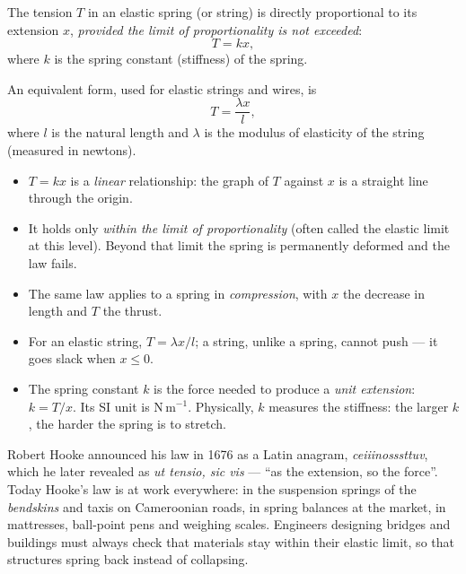 \documentclass[11pt]{article}
\newcommand{\cle}[1]{{\popxbold\color{popdark}#1}}
\begin{document}
\begin{propriete}
The \cle{tension} $T$ in an elastic spring (or string) is directly proportional to its \cle{extension} $x$, \emph{provided the limit of proportionality is not exceeded}:
\[ T = kx, \]
where $k$ is the \cle{spring constant} (stiffness) of the spring.

An equivalent form, used for elastic strings and wires, is
\[ T = \frac{\lambda x}{l}, \]
where $l$ is the natural length and $\lambda$ is the \cle{modulus of elasticity} of the string (measured in newtons).
\end{propriete}

\begin{aretenir}
\begin{itemize}
\item $T = kx$ is a \emph{linear} relationship: the graph of $T$ against $x$ is a straight line through the origin.
\item It holds only \emph{within the limit of proportionality} (often called the elastic limit at this level). Beyond that limit the spring is permanently deformed and the law fails.
\item The same law applies to a spring in \emph{compression}, with $x$ the decrease in length and $T$ the thrust.
\item For an elastic string, $T = \lambda x / l$; a string, unlike a spring, cannot push — it goes slack when $x \le 0$.
\item The spring constant $k$ is the force needed to produce a \emph{unit extension}: $k = T/x$. Its SI unit is $\mathrm{N\,m^{-1}}$. Physically, $k$ measures the \cle{stiffness}: the larger $k$, the harder the spring is to stretch.
\end{itemize}
\end{aretenir}

\begin{savaistu}
Robert Hooke announced his law in 1676 as a Latin anagram, \emph{ceiiinosssttuv}, which he later revealed as \emph{ut tensio, sic vis} — ``as the extension, so the force''. Today Hooke's law is at work everywhere: in the suspension springs of the \emph{bendskins} and taxis on Cameroonian roads, in spring balances at the market, in mattresses, ball-point pens and weighing scales. Engineers designing bridges and buildings must always check that materials stay within their elastic limit, so that structures spring back instead of collapsing.
\end{savaistu}
\end{document}
